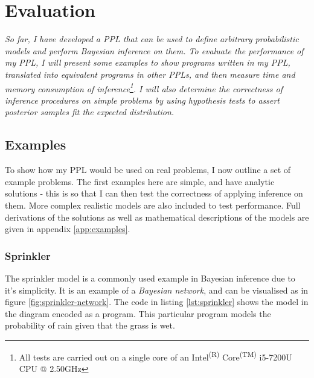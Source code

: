



\chapter{Evaluation}
\vspace{1cm}
\textit{So far, I have developed a PPL that can be used to define arbitrary probabilistic models and perform Bayesian inference on them. To evaluate the performance of my PPL, I will present some examples to show programs written in my PPL, translated into equivalent programs in other PPLs, and then measure time and memory consumption of inference\footnote{All tests are carried out on a single core of an Intel\textsuperscript{(R)} Core\textsuperscript{(TM)} i5-7200U CPU @ 2.50GHz}. I will also determine the correctness of inference procedures on simple problems by using hypothesis tests to assert posterior samples fit the expected distribution.}

\section{Examples}
To show how my PPL would be used on real problems, I now outline a set of example problems. The first examples here are simple, and have analytic solutions - this is so that I can then test the correctness of applying inference on them. More complex realistic models are also included to test performance. Full derivations of the solutions as well as mathematical descriptions of the models are given in appendix \ref{app:examples}.

\subsection{Sprinkler}
The sprinkler model is a commonly used example in Bayesian inference due to it's simplicity. It is an example of a \textit{Bayesian network}, and can be visualised as in figure \ref{fig:sprinkler-network}. The code in listing \ref{lst:sprinkler} shows the model in the diagram encoded as a program. This particular program models the probability of rain given that the grass is wet.

